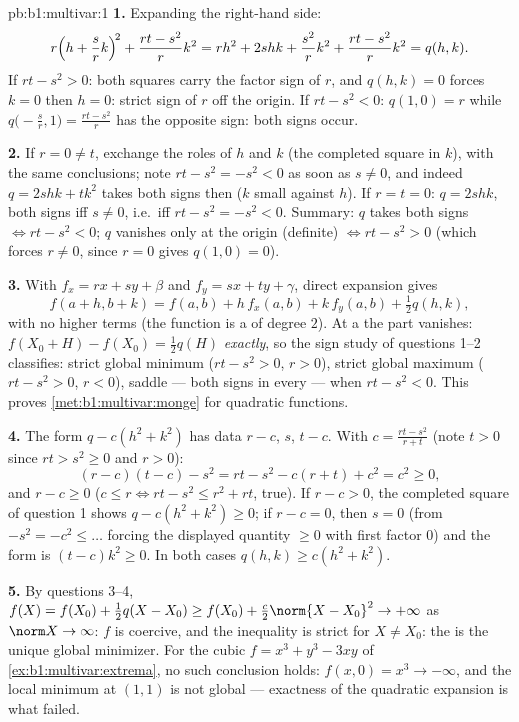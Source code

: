 \begin{solution}{pb:b1:multivar:1}
\textbf{1.} Expanding the right-hand side:
\[
r\Bigl(h + \frac srk\Bigr)^{\!2} + \frac{rt - s^2}{r}k^2
= rh^2 + 2shk + \frac{s^2}{r}k^2 + \frac{rt - s^2}{r}k^2
= q(h,k) .
\]
If $rt - s^2 > 0$: both squares carry the factor sign of $r$,
and $q(h,k) = 0$ forces $k = 0$ then $h = 0$: strict sign of $r$
off the origin. If $rt - s^2 < 0$: $q(1, 0) = r$ while
$q\bigl(-\frac sr, 1\bigr) = \frac{rt - s^2}{r}$ has the
opposite sign: both signs occur.

\textbf{2.} If $r = 0 \neq t$, exchange the roles of $h$ and $k$
(the completed square in $k$), with the same conclusions; note
$rt - s^2 = -s^2 < 0$ as soon as $s \neq 0$, and indeed $q =
2shk + tk^2$ takes both signs then ($k$ small against $h$). If
$r = t = 0$: $q = 2shk$, both signs iff $s \neq 0$, i.e.\ iff
$rt - s^2 = -s^2 < 0$. Summary: $q$ takes both signs $\iff rt -
s^2 < 0$; $q$ vanishes only at the origin (definite) $\iff rt -
s^2 > 0$ (which forces $r \neq 0$, since $r = 0$ gives $q(1,0) =
0$).

\textbf{3.} With $f_x = rx + sy + \beta$ and $f_y = sx + ty +
\gamma$, direct expansion gives
\[
f(a + h, b + k) = f(a, b) + h\,f_x(a,b) + k\,f_y(a,b)
+ \tfrac12 q(h, k),
\]
with no higher terms (the function is a  of degree
$2$). At a  the  part vanishes: $f(X_0 + H)
- f(X_0) = \frac12 q(H)$ \emph{exactly}, so the sign study of
questions 1--2 classifies: strict global minimum ($rt - s^2 >
0$, $r > 0$), strict global maximum ($rt - s^2 > 0$, $r < 0$),
saddle --- both signs in every  --- when $rt - s^2 <
0$. This proves \cref{met:b1:multivar:monge} for quadratic
functions.

\textbf{4.} The form $q - c(h^2 + k^2)$ has data $r - c$, $s$,
$t - c$. With $c = \frac{rt - s^2}{r + t}$ (note $t > 0$ since
$rt > s^2 \geq 0$ and $r > 0$):
\[
(r - c)(t - c) - s^2 = rt - s^2 - c(r + t) + c^2 = c^2 \geq 0,
\]
and $r - c \geq 0$ ($c \leq r \iff rt - s^2 \leq r^2 + rt$,
true). If $r - c > 0$, the completed square of question 1 shows
$q - c(h^2 + k^2) \geq 0$; if $r - c = 0$, then $s = 0$ (from
$-s^2 = -c^2 \leq \dots$ forcing the displayed quantity
$\geq 0$ with first factor $0$) and the form is $(t - c)k^2 \geq
0$. In both cases $q(h,k) \geq c(h^2 + k^2)$.

\textbf{5.} By questions 3--4, $f(X) = f(X_0) + \frac12 q(X -
X_0) \geq f(X_0) + \frac c2\norm{X - X_0}^2 \to +\infty$ as
$\norm X \to \infty$: $f$ is coercive, and the inequality is
strict for $X \neq X_0$: the  is the unique global
minimizer. For the cubic $f = x^3 + y^3 - 3xy$ of
\cref{ex:b1:multivar:extrema}, no such conclusion holds: $f(x,0)
= x^3 \to -\infty$, and the local minimum at $(1,1)$ is not
global --- exactness of the quadratic expansion is what failed.


\end{solution}
